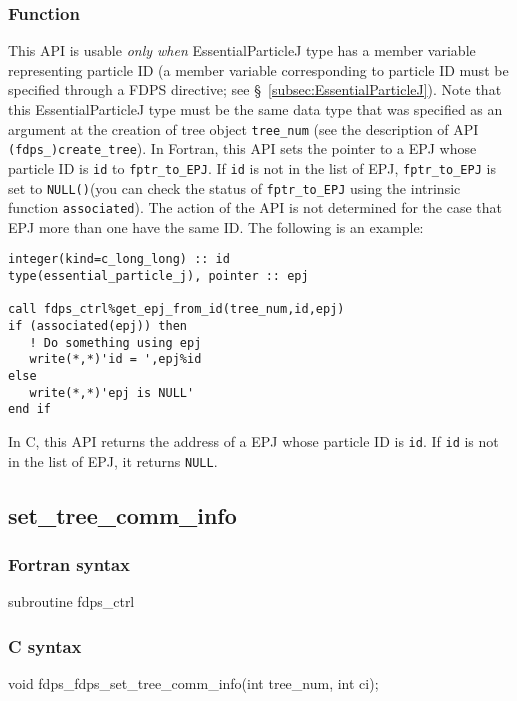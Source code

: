 \subsubsection*{Function}
This API is usable \textit{only when} EssentialParticleJ type has a member variable representing particle ID (a member variable corresponding to particle ID must be specified through a FDPS directive; see \S~\ref{subsec:EssentialParticleJ}). Note that this EssentialParticleJ type must be the same data type that was specified as an argument at the creation of tree object \texttt{tree\_num} (see the description of API \texttt{(fdps\_)create\_tree}). In Fortran, this API sets the pointer to a EPJ whose particle ID is \texttt{id} to \texttt{fptr\_to\_EPJ}. If \texttt{id} is not in the list of EPJ, \texttt{fptr\_to\_EPJ} is set to \texttt{NULL()}(you can check the status of \texttt{fptr\_to\_EPJ} using the intrinsic function \texttt{associated}). The action of the API is not determined for the case that EPJ more than one have the same ID. The following is an example:
\begin{lstlisting}[caption=Example]
integer(kind=c_long_long) :: id
type(essential_particle_j), pointer :: epj

call fdps_ctrl%get_epj_from_id(tree_num,id,epj)
if (associated(epj)) then
   ! Do something using epj
   write(*,*)'id = ',epj%id
else 
   write(*,*)'epj is NULL'
end if
\end{lstlisting}
In C, this API returns the address of a EPJ whose particle ID is \texttt{id}. If \texttt{id} is not in the list of EPJ, it returns \texttt{NULL}.


\subsection{set\_tree\_comm\_info}
\subsubsection*{Fortran syntax}
\begin{screen}
\begin{spverbatim}
subroutine fdps_ctrl%
\end{spverbatim}
\end{screen}

\subsubsection*{C syntax}
\begin{screen}
\begin{spverbatim}
void fdps_fdps_set_tree_comm_info(int tree_num,
                                   int ci);
\end{spverbatim}
\end{screen}



